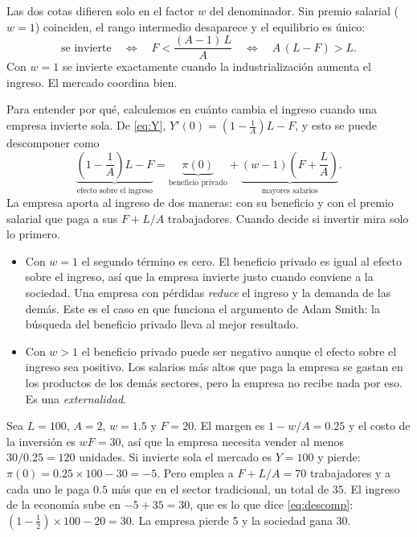 \documentclass[12pt,letterpaper]{article}
\begin{document}
Las dos cotas difieren solo en el factor $w$ del denominador. Sin premio salarial ($w=1$) coinciden, el rango intermedio desaparece y el equilibrio es único:
\[
  \text{se invierte}\quad\Longleftrightarrow\quad F<\frac{(A-1)\,L}{A}\quad\Longleftrightarrow\quad A\,(L-F)>L .
\]
Con $w=1$ se invierte exactamente cuando la industrialización aumenta el ingreso. El mercado coordina bien.

Para entender por qué, calculemos en cuánto cambia el ingreso cuando una empresa invierte sola. De \eqref{eq:Y}, $Y'(0)=\left(1-\frac{1}{A}\right)L-F$, y esto se puede descomponer como
\begin{equation}\label{eq:descomp}
  \underbrace{\left(1-\frac{1}{A}\right)L-F}_{\text{efecto sobre el ingreso}}
  =\underbrace{\pi(0)}_{\text{beneficio privado}}
  +\underbrace{(w-1)\left(F+\frac{L}{A}\right)}_{\text{mayores salarios}} .
\end{equation}
La empresa aporta al ingreso de dos maneras: con su beneficio y con el premio salarial que paga a sus $F+L/A$ trabajadores. Cuando decide si invertir mira solo lo primero.

\begin{itemize}
  \item Con $w=1$ el segundo término es cero. El beneficio privado es igual al efecto sobre el ingreso, así que la empresa invierte justo cuando conviene a la sociedad. Una empresa con pérdidas \emph{reduce} el ingreso y la demanda de las demás. Este es el caso en que funciona el argumento de Adam Smith: la búsqueda del beneficio privado lleva al mejor resultado.
  \item Con $w>1$ el beneficio privado puede ser negativo aunque el efecto sobre el ingreso sea positivo. Los salarios más altos que paga la empresa se gastan en los productos de los demás sectores, pero la empresa no recibe nada por eso. Es una \emph{externalidad}.
\end{itemize}

\begin{intuicion}
Sea $L=100$, $A=2$, $w=1.5$ y $F=20$. El margen es $1-w/A=0.25$ y el costo de la inversión es $wF=30$, así que la empresa necesita vender al menos $30/0.25=120$ unidades. Si invierte sola el mercado es $Y=100$ y pierde: $\pi(0)=0.25\times100-30=-5$. Pero emplea a $F+L/A=70$ trabajadores y a cada uno le paga $0.5$ más que en el sector tradicional, un total de $35$. El ingreso de la economía sube en $-5+35=30$, que es lo que dice \eqref{eq:descomp}: $(1-\tfrac12)\times100-20=30$. La empresa pierde 5 y la sociedad gana 30.
\end{intuicion}
\end{document}
